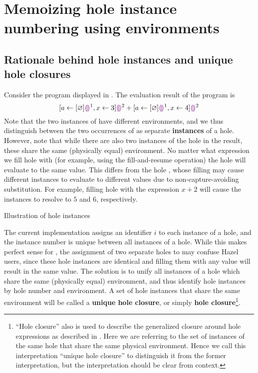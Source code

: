 \chapter{Memoizing hole instance numbering using environments}
\label{sec:renumbering}

\section{Rationale behind hole instances and unique hole closures}
\label{sec:instance-illustration}

Consider the program displayed in . The evaluation result of the program is \[
  [a\leftarrow[\varnothing]\textcolor{violet}{\llparenthesis}\textcolor{violet}{\rrparenthesis}^1,x\leftarrow 3]\textcolor{violet}{\llparenthesis}\textcolor{violet}{\rrparenthesis}^2
  + [a\leftarrow[\varnothing]\textcolor{violet}{\llparenthesis}\textcolor{violet}{\rrparenthesis}^1,x\leftarrow 4]\textcolor{violet}{\llparenthesis}\textcolor{violet}{\rrparenthesis}^2
\] Note that the two instances of  have different environments, and we thus distinguish between the two occurrences of  as separate \textbf{instances} of a hole. However, note that while there are also two instances of the hole  in the result, these share the same (physically equal) environment. No matter what expression we fill hole  with (for example, using the fill-and-resume operation) the hole will evaluate to the same value. This differs from the hole , whose filling may cause different instances to evaluate to different values due to non-capture-avoiding substitution. For example, filling hole  with the expression $x+2$ will cause the instances to resolve to $5$ and $6$, respectively.

\begin{listing}
  \caption{Illustration of hole instances}
  \label{fig:instance-illustration}
\end{listing}

The current implementation assigns an identifier $i$ to each instance of a hole, and the instance number is unique between all instances of a hole. While this makes perfect sense for , the assignment of two separate holes to  may confuse Hazel users, since these hole instances are identical and filling them with any value will result in the same value. The solution is to unify all instances of a hole which share the same (physically equal) environment, and thus identify hole instances by hole number and environment. A set of hole instances that share the same environment will be called a \textbf{unique hole closure}, or simply \textbf{hole closure}\footnote{``Hole closure'' also is used to describe the generalized closure around hole expressions as described in . Here we are referring to the set of instances of the same hole that share the same physical environment. Hence we call this interpretation ``unique hole closure'' to distinguish it from the former interpretation, but the interpretation should be clear from context.}.

